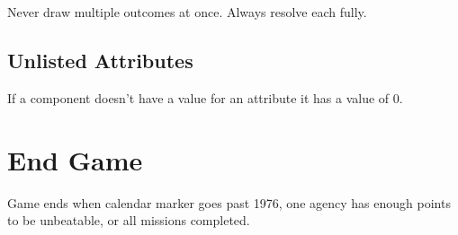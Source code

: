 \documentclass[12pt]{article}
\begin{document}
\begin{multicols*}{2}
Never draw multiple outcomes at once. Always resolve each fully.

\subsection*{Unlisted Attributes}
If a component doesn't have a value for an attribute it has a value of 0.

\section*{End Game}
Game ends when calendar marker goes past 1976, one agency has enough points to be unbeatable, or all missions completed.

\end{multicols*}
\end{document}
